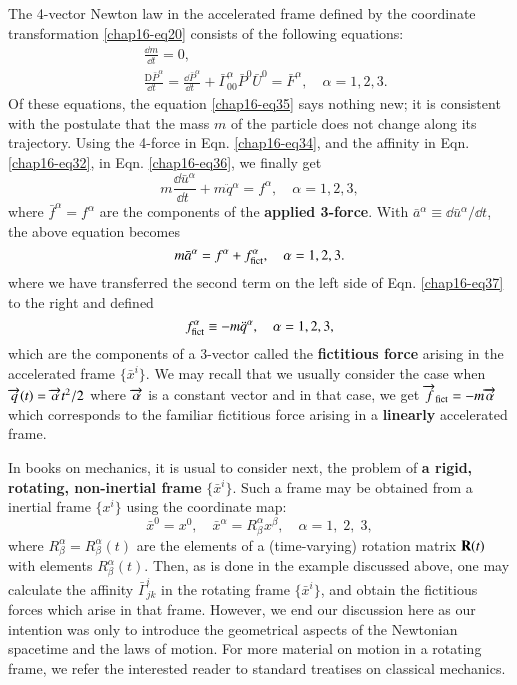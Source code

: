 The 4-vector Newton law in the accelerated frame  defined by the coordinate transformation \eqref{chap16-eq20} consists of the following equations: 
\begin{align}
&\frac{\dd m}{\dd t}=0,\label{chap16-eq35}\\
&\frac{\mathrm{D} {\bar{P}}^\alpha}{\dd t\;\:}= \frac{\dd \bar{P}^\alpha}{\dd t\;\:} + \bar{\Gamma}^\alpha_{00} \bar{P}^0 \bar{U}^0= {\bar{F}^\alpha},\quad \alpha=1,2,3. \label{chap16-eq36}
\end{align} 
Of these equations, the equation \eqref{chap16-eq35} says nothing new; it  is consistent with the postulate  that the mass $m$ of the  particle does not change along its trajectory. Using the 4-force in Eqn. \eqref{chap16-eq34}, and the affinity in Eqn. \eqref{chap16-eq32}, in Eqn. \eqref{chap16-eq36}, we finally get
\begin{equation}
m\frac{\dd \bar{u}^\alpha}{\dd t\;}+m{\ddot{q}}{}^\alpha= f^\alpha, \quad \alpha=1,2,3,\label{chap16-eq37}
\end{equation}
where $\bar{f}^{\alpha}={f}^{\alpha}$ are the components of the \textbf{applied 3-force}. With $\bar{a}^\alpha\equiv{\dd \bar{u}^\alpha/\dd t}$, the above equation becomes
\begin{equation}
m\bar{a}^\alpha= f^\alpha+ f_{\rm{fict}}^\alpha,\quad \alpha=1,2,3.\label{chap16-eq38}
\end{equation}
where we have transferred the second term on the left side of Eqn. \eqref{chap16-eq37} to the right and defined
\begin{equation}
f_{\rm{fict}}^\alpha \equiv -m\ddot{q}^\alpha,\quad \alpha=1,2,3,\label{chap16-eq39}
\end{equation}
which are the components of a 3-vector called the \textbf{fictitious force} arising in the  accelerated frame $\{\bar{x}^i \}$. We may recall that we usually consider the case  when $\overrightarrow{q}(t)=\overrightarrow{\alpha} t^2/2$ where $\overrightarrow{\alpha}$ is a constant vector and in that  case, we get $\overrightarrow{f}_{\rm{fict}}=-m\overrightarrow{\alpha}$ which corresponds to  the familiar fictitious force arising in a \textbf{linearly} accelerated frame.

In books on mechanics, it is usual to consider next, the problem of \textbf{a rigid, rotating, non-inertial frame} $\{\bar{x}^i\}$. Such a frame may be obtained from a inertial frame  $\{ x^i\}$ using the coordinate map:
\begin{equation}
\bar{x}^0=x^0, \quad \bar{x}^\alpha={R}^{\alpha}_{\beta} {x}^{\beta}, \quad \alpha=1,\;2,\;3,\label{chap16-eq40}
\end{equation}
where  ${R}^{\alpha}_{\beta}={R}^{\alpha}_{\beta}(t)$ are the elements of a (time-varying) rotation matrix ${\mathbf{R}} (t)$ with elements ${R}^{\alpha}_{\beta}(t)$. Then, as is done in the example discussed above, one may calculate the affinity $\bar{\Gamma}^i_{jk}$ in the rotating frame $\{\bar{x}^i\}$, and obtain the fictitious forces which arise in that frame. However, we end our discussion here as our intention was only to introduce the geometrical aspects of the Newtonian spacetime and the  laws of motion. For more material on motion in a rotating frame, we refer the interested reader to standard treatises on classical mechanics.

